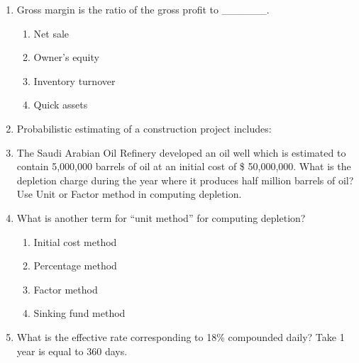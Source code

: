 \documentclass[11pt,a4paper]{article}
\begin{document}
\begin{enumerate}
\begin{enumerate*}[itemjoin=\qquad, label=\Alph*.]
\end{enumerate*}
\item{Gross margin is the ratio of the gross profit to \_\_\_\_\_\_.}
\begin{enumerate}[label=\Alph*.]
\item{Net sale}
\item{Owner's equity}
\item{Inventory turnover}
\item{Quick assets}
\end{enumerate}
\item{Probabilistic estimating of a construction project includes:}
\\
\item{The Saudi Arabian Oil Refinery developed an oil well which is estimated to contain 5,000,000 barrels of oil at an initial cost of \$ 50,000,000. What is the depletion charge during the year where it produces half million barrels of oil? Use Unit or Factor method in computing depletion.}
\\
\item{What is another term for ``unit method'' for computing depletion?
}
\begin{enumerate}[label=\Alph*.]
\item{Initial cost method}
\item{Percentage method}
\item{Factor method}
\item{Sinking fund method}
\end{enumerate}
\item{What is the effective rate corresponding to 18\% compounded daily? Take 1 year is equal to 360 days.}
\\\begin{enumerate*}[itemjoin=\qquad, label=\Alph*.]

\end{enumerate*}
\end{enumerate}
\end{document}
